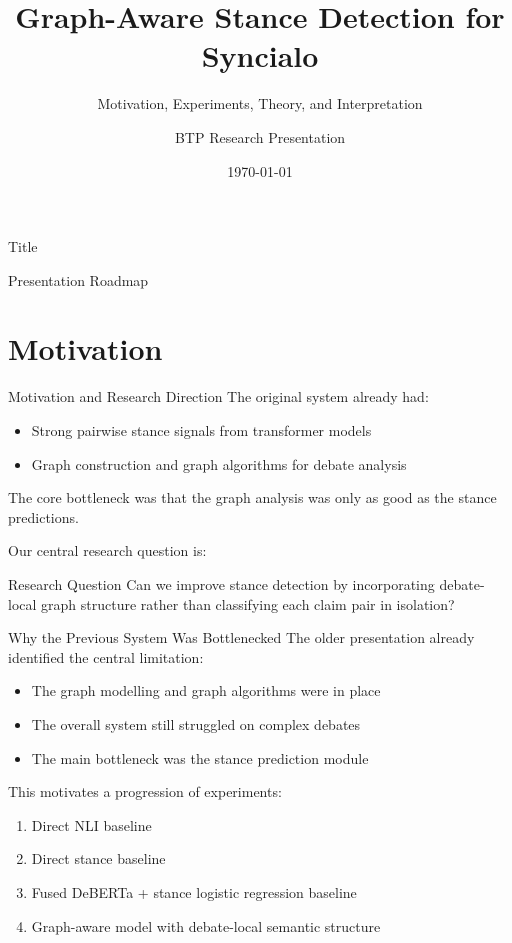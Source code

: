 \documentclass[aspectratio=169]{beamer}
\title{Graph-Aware Stance Detection for Syncialo}
\subtitle{Motivation, Experiments, Theory, and Interpretation}
\author{BTP Research Presentation}
\institute{Indian Institute of Information Technology Kottayam}
\date{\today}
\begin{document}
\begin{frame}{Title}
  \titlepage
\end{frame}

\begin{frame}{Presentation Roadmap}
  \tableofcontents
\end{frame}

\section{Motivation}

\begin{frame}{Motivation and Research Direction}
The original system already had:
\begin{itemize}
  \item Strong pairwise stance signals from transformer models
  \item Graph construction and graph algorithms for debate analysis
\end{itemize}

The core bottleneck was that the graph analysis was only as good as the stance predictions.

Our central research question is:
\begin{block}{Research Question}
Can we improve stance detection by incorporating debate-local graph structure rather than classifying each claim pair in isolation?
\end{block}
\end{frame}

\begin{frame}{Why the Previous System Was Bottlenecked}
The older presentation already identified the central limitation:
\begin{itemize}
  \item The graph modelling and graph algorithms were in place
  \item The overall system still struggled on complex debates
  \item The main bottleneck was the stance prediction module
\end{itemize}

This motivates a progression of experiments:
\begin{enumerate}
  \item Direct NLI baseline
  \item Direct stance baseline
  \item Fused DeBERTa + stance logistic regression baseline
  \item Graph-aware model with debate-local semantic structure
\end{enumerate}
\end{frame}
\end{document}
